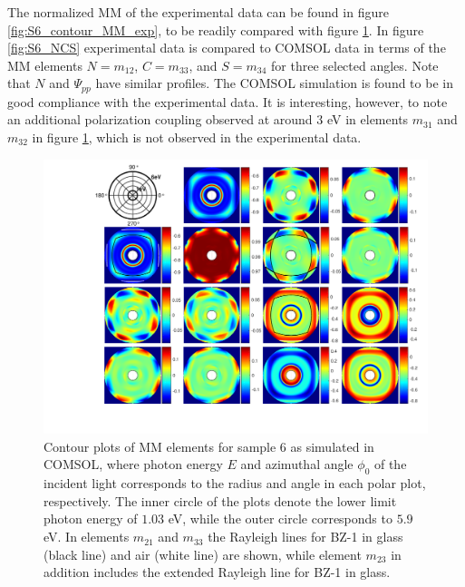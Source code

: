 The normalized MM of the experimental data can be found in figure \ref{fig:S6_contour_MM_exp}, to be readily compared with figure \ref{fig:S6_contour_MM}. In figure \ref{fig:S6_NCS} experimental data is compared to COMSOL data in terms of the MM elements $N=m_{12}$, $C=m_{33}$, and $S=m_{34}$ for three selected angles. Note that $N$ and $\Psi_{pp}$ have similar profiles. The COMSOL simulation is found to be in good compliance with the experimental data. It is interesting, however, to note an additional polarization coupling observed at around $3$ eV in elements $m_{31}$ and $m_{32}$ in figure \ref{fig:S6_contour_MM}, which is not observed in the experimental data.

\begin{figure}[h!]  %
    \centering
    \includegraphics[width=\linewidth, trim=3cm 1.5cm 0.5cm 0cm, clip]{figures/ch4/S6/contour/Mueller_rot_S6_COMSOLSIM_55(2)(1).pdf}
    \caption{Contour plots of MM elements for sample 6 as simulated in COMSOL, where photon energy $E$ and azimuthal angle $\phi_0$ of the incident light corresponds to the radius and angle in each polar plot, respectively. The inner circle of the plots denote the lower limit photon energy of $1.03$ eV, while the outer circle corresponds to $5.9$ eV. In elements $m_{21}$ and $m_{33}$ the Rayleigh lines for BZ-1 in glass (black line) and air (white line) are shown, while element $m_{23}$ in addition includes the extended Rayleigh line for BZ-1 in glass.}
    \label{fig:S6_contour_MM} 
\end{figure}
